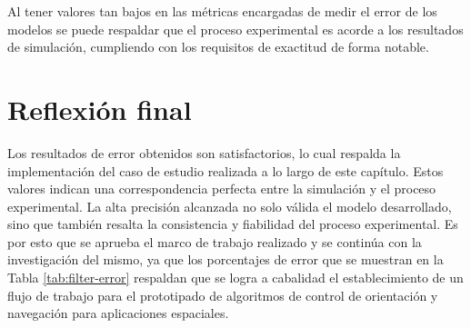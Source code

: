 Al tener valores tan bajos en las métricas encargadas de medir el error de los modelos se puede respaldar que el proceso experimental es acorde a los resultados de simulación, cumpliendo con los requisitos de exactitud de forma notable.

\section{Reflexión final}

Los resultados de error obtenidos son satisfactorios, lo cual respalda la implementación del caso de estudio realizada a lo largo de este capítulo. Estos valores indican una correspondencia perfecta entre la simulación y el proceso experimental. La alta precisión alcanzada no solo válida el modelo desarrollado, sino que también resalta la consistencia y fiabilidad del proceso experimental. Es por esto que se aprueba el marco de trabajo realizado y se continúa con la investigación del mismo, ya que los porcentajes de error que se muestran en la Tabla \ref{tab:filter-error} respaldan que se logra a cabalidad el establecimiento de un flujo de trabajo para el prototipado de algoritmos de control de orientación y navegación para aplicaciones espaciales.  
